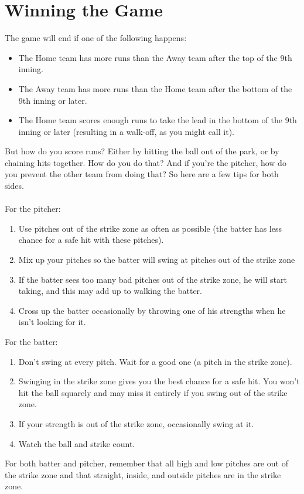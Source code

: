 \documentclass[12pt,a4paper]{report}
\begin{document}
\section{Winning the Game}
The game will end if one of the following happens:
\begin{itemize}
	\item The Home team has more runs than the Away team after the top of the 9th inning.
	\item The Away team has more runs than the Home team after the bottom of the 9th inning or later.
	\item The Home team scores enough runs to take the lead in the bottom of the 9th inning or later (resulting in a walk-off, as you might call it).
\end{itemize}
But how do you score runs? Either by hitting the ball out of the park, or by chaining hits together. How do you do that? And if you're the pitcher, how do you prevent the other team from doing that? So here are a few tips for both sides.\\\\
For the pitcher:
\begin{enumerate}
	\item Use pitches out of the strike zone as often as possible (the batter has less chance for a safe hit with these pitches).
	\item Mix up your pitches so the batter will swing at pitches out of the strike zone
	\item If the batter sees too many bad pitches out of the strike zone, he will start taking, and this may add up to walking the batter.
	\item Cross up the batter occasionally by throwing one of his strengths when he isn't looking for it.
\end{enumerate}
For the batter:
\begin{enumerate}
	\item Don't swing at every pitch. Wait for a good one (a pitch in the strike zone).
	\item Swinging in the strike zone gives you the best chance for a safe hit. You won't hit the ball squarely and may miss it entirely if you swing out of the strike zone.
	\item If your strength is out of the strike zone, occasionally swing at it.
	\item Watch the ball and strike count.
\end{enumerate}
For both batter and pitcher, remember that all high and low pitches are out of the strike zone and that straight, inside, and outside pitches are in the strike zone.
\end{document}
